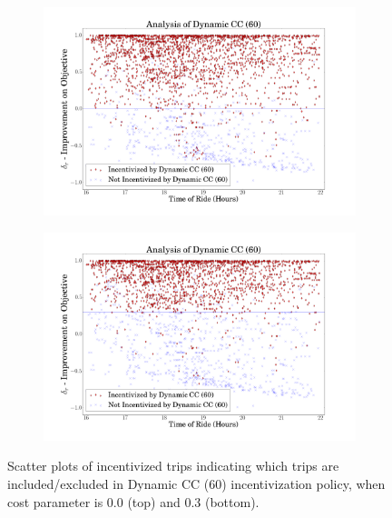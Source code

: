 \begin{figure}
\centering

 \begin{subfigure}{\textwidth}
 \includegraphics[width=.5\textwidth]{../SubmissionPlots/ActuallyUsed/scatter_60_0.png}
 \end{subfigure}
 \begin{subfigure}{\textwidth}
 \includegraphics[width=.5\textwidth]{../SubmissionPlots/ActuallyUsed/scatter_60_3.png}
 \end{subfigure}
 
 \caption{Scatter plots of incentivized trips indicating which trips are included/excluded in Dynamic CC (60) incentivization policy, when cost parameter is 0.0 (top) and 0.3 (bottom).}

\label{fig: Dynamic CC 60 Policy}
\end{figure}



